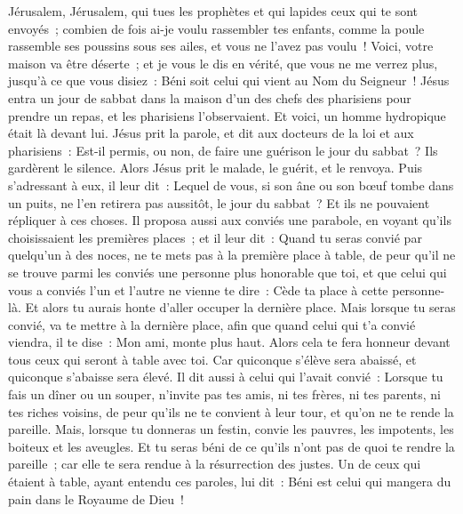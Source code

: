 \begin{multicols}{2}
Jérusalem, Jérusalem, qui tues les prophètes et qui lapides ceux qui te sont envoyés~; combien de fois ai-je voulu rassembler tes enfants, comme la poule rassemble ses poussins sous ses ailes, et vous ne l'avez pas voulu~!
Voici, votre maison va être déserte~; et je vous le dis en vérité, que vous ne me verrez plus, jusqu'à ce que vous disiez~: Béni soit celui qui vient au Nom du Seigneur~!
\VerseOne{}Jésus entra un jour de sabbat dans la maison d'un des chefs des pharisiens pour prendre un repas, et les pharisiens l'observaient.
Et voici, un homme hydropique était là devant lui.
Jésus prit la parole, et dit aux docteurs de la loi et aux pharisiens~: Est-il permis, ou non, de faire une guérison le jour du sabbat~?
Ils gardèrent le silence. Alors Jésus prit le malade, le guérit, et le renvoya.
Puis s'adressant à eux, il leur dit~: Lequel de vous, si son âne ou son bœuf tombe dans un puits, ne l'en retirera pas aussitôt, le jour du sabbat~?
Et ils ne pouvaient répliquer à ces choses.
Il proposa aussi aux conviés une parabole, en voyant qu'ils choisissaient les premières places~; et il leur dit~:
Quand tu seras convié par quelqu'un à des noces, ne te mets pas à la première place à table, de peur qu'il ne se trouve parmi les conviés une personne plus honorable que toi,
et que celui qui vous a conviés l'un et l'autre ne vienne te dire~: Cède ta place à cette personne-là. Et alors tu aurais honte d'aller occuper la dernière place.
Mais lorsque tu seras convié, va te mettre à la dernière place, afin que quand celui qui t'a convié viendra, il te dise~: Mon ami, monte plus haut. Alors cela te fera honneur devant tous ceux qui seront à table avec toi.
Car quiconque s'élève sera abaissé, et quiconque s'abaisse sera élevé.
Il dit aussi à celui qui l'avait convié~: Lorsque tu fais un dîner ou un souper, n'invite pas tes amis, ni tes frères, ni tes parents, ni tes riches voisins, de peur qu'ils ne te convient à leur tour, et qu'on ne te rende la pareille.
Mais, lorsque tu donneras un festin, convie les pauvres, les impotents, les boiteux et les aveugles.
Et tu seras béni de ce qu'ils n'ont pas de quoi te rendre la pareille~; car elle te sera rendue à la résurrection des justes.
Un de ceux qui étaient à table, ayant entendu ces paroles, lui dit~: Béni est celui qui mangera du pain dans le Royaume de Dieu~!

\end{multicols}
